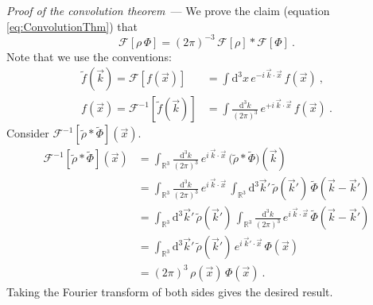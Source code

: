 \documentclass[10pt]{article}
\renewcommand{\paragraph}[1]{\par\addvspace{1.5ex}\noindent\textsl{#1}~---}
\renewcommand{\d}{\mathrm{d}}
\begin{document}
\paragraph{Proof of the convolution theorem} We prove the claim (equation \eqref{eq:ConvolutionThm}) that
\begin{equation}
    \mathcal{F}[\rho \, \Phi] 
    = (2\pi)^{-3} \, \mathcal{F}[\rho] \ast \mathcal{F}[\Phi] ~.
\end{equation}
Note that we use the conventions:
\begin{align}
    \tilde{f}(\vec{k})
    = \mathcal{F}[f(\vec{x})]
    &= \int \d^3 x
        \, e^{-i \, \vec{k} \cdot \vec{x}}
        \, f(\vec{x})~, \\
    f(\vec{x})
    = \mathcal{F}^{-1}[\tilde{f}(\vec{k})]
    &= \int \frac{\d^3 k}{(2\pi)^3}
        \, e^{+i \, \vec{k} \cdot \vec{x}}
        \, f(\vec{x})~.
\end{align}
Consider $\mathcal{F}^{-1}[\tilde{\rho} \ast \tilde{\Phi}](\vec{x})$. 
\begin{align}
    \mathcal{F}^{-1}[\tilde{\rho} \ast \tilde{\Phi}](\vec{x})
    &= \int_{\mathbb{R}^3} \frac{\d^3 k}{(2\pi)^3}
        \, e^{i \, \vec{k} \cdot \vec{x}} 
        \, \big( \tilde{\rho} \ast \tilde{\Phi} \big) (\vec{k}) 
        \nonumber\\
    &= \int_{\mathbb{R}^3} \frac{\d^3 k}{(2\pi)^3}
        \, e^{i \, \vec{k} \cdot \vec{x}} 
        \, \int_{\mathbb{R}^3} \d^3 \vec{k}' 
        \, \tilde{\rho}(\vec{k}') 
        \, \tilde{\Phi}(\vec{k} - \vec{k}')
        \nonumber\\
    &= \int_{\mathbb{R}^3} \d^3 \vec{k}'
        \, \tilde{\rho}(\vec{k}') 
        \, \int_{\mathbb{R}^3} \frac{\d^3 k}{(2\pi)^3}
        \, e^{i \, \vec{k} \cdot \vec{x}} 
        \, \tilde{\Phi}(\vec{k} - \vec{k}')
        \nonumber\\
    &= \int_{\mathbb{R}^3} \d^3 \vec{k}'
        \, \tilde{\rho}(\vec{k}') 
        \, e^{i \, \vec{k}' \cdot \vec{x}}
        \, \Phi(\vec{x})
        \nonumber\\
    &= (2\pi)^3
        \, \rho(\vec{x}) 
        \, \Phi(\vec{x})~.
\end{align}
Taking the Fourier transform of both sides gives the desired result.
\end{document}
